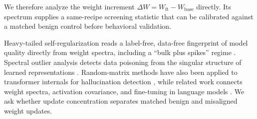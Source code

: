 \documentclass[11pt]{article}
\theoremstyle{definition}
\theoremstyle{remark}
\newcommand{\dW}{\Delta W}
\begin{document}
We therefore analyze the weight increment
$\dW=W_{\mathrm{ft}}-W_{\mathrm{base}}$ directly. Its spectrum supplies a
same-recipe screening statistic that can be calibrated against a matched benign
control before behavioral validation.

Heavy-tailed self-regularization reads a label-free, data-free fingerprint of model
quality directly from weight spectra, including a ``bulk plus spikes'' regime
\cite{martin2021}. Spectral outlier analysis detects data poisoning from the singular
structure of learned representations \cite{tran2018}. Random-matrix methods have
also been applied to transformer internals for hallucination detection
\cite{ettori2026}, while related work connects weight spectra, activation
covariance, and fine-tuning in language models \cite{staats2024}. We ask whether
update concentration separates matched benign and misaligned weight updates.
\end{document}
